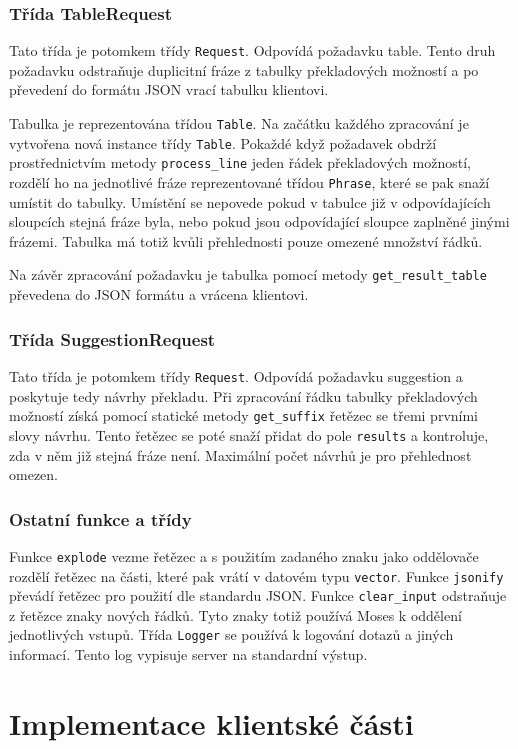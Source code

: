 \documentclass[12pt,a4paper]{report}
\begin{document}
\subsection{Třída TableRequest}
Tato třída je potomkem třídy {\tt Request}. Odpovídá požadavku table. Tento druh požadavku odstraňuje duplicitní fráze z tabulky překladových možností a po převedení do formátu JSON vrací tabulku klientovi.

Tabulka je reprezentována třídou {\tt Table}. Na začátku každého zpracování je vytvořena nová instance třídy {\tt Table}. Pokaždé když požadavek obdrží prostřednictvím metody {\tt process\_line} jeden řádek překladových možností, rozdělí ho na jednotlivé fráze reprezentované třídou {\tt Phrase}, které se pak snaží umístit do tabulky. Umístění se nepovede pokud v tabulce již v odpovídajících sloupcích stejná fráze byla, nebo pokud jsou odpovídající sloupce zaplněné jinými frázemi. Tabulka má totiž kvůli přehlednosti pouze omezené množství řádků. 

Na závěr zpracování požadavku je tabulka pomocí metody {\tt get\_result\_table} převedena do JSON formátu a vrácena klientovi.

\subsection{Třída SuggestionRequest}
Tato třída je potomkem třídy {\tt Request}. Odpovídá požadavku suggestion a poskytuje tedy návrhy překladu. Při zpracování řádku tabulky překladových možností získá pomocí statické metody {\tt get\_suffix} řetězec se třemi prvními slovy návrhu. Tento řetězec se poté snaží přidat do pole {\tt results} a kontroluje, zda v něm již stejná fráze není. Maximální počet návrhů je pro přehlednost omezen.

\subsection{Ostatní funkce a třídy}
Funkce {\tt explode} vezme řetězec a s použitím zadaného znaku jako oddělovače rozdělí řetězec na části, které pak vrátí v datovém typu {\tt vector}. Funkce {\tt jsonify} převádí řetězec pro použití dle standardu JSON. Funkce {\tt clear\_input} odstraňuje z řetězce znaky nových řádků. Tyto znaky totiž používá Moses k oddělení jednotlivých vstupů. Třída {\tt Logger} se používá k logování dotazů a jiných informací. Tento log vypisuje server na standardní výstup.

\chapter{Implementace klientské části}
\end{document}
